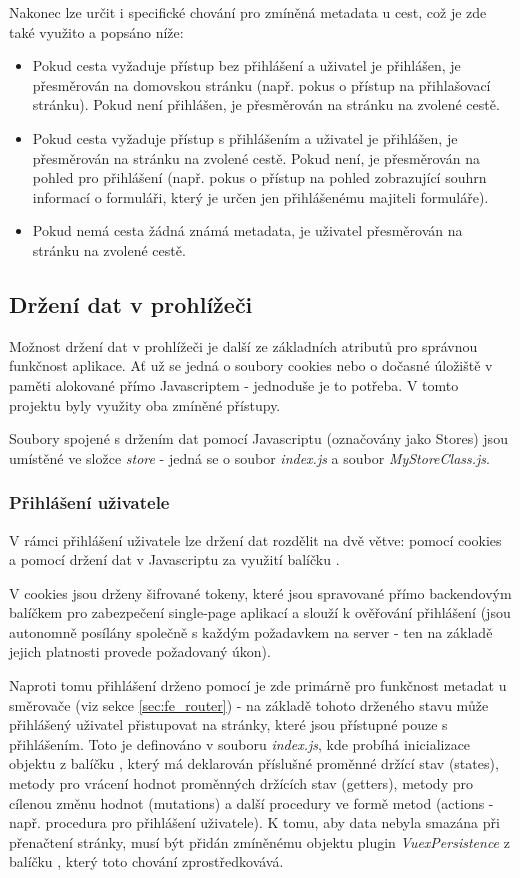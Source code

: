 	Nakonec lze určit i specifické chování pro zmíněná metadata u cest, což je zde také využito a popsáno níže:
	\begin{itemize}
		\item Pokud cesta vyžaduje přístup bez přihlášení a uživatel je přihlášen, je přesměrován na domovskou stránku (např. pokus o přístup na přihlašovací stránku). Pokud není přihlášen, je přesměrován na stránku na zvolené cestě.
		\item Pokud cesta vyžaduje přístup s přihlášením a uživatel je přihlášen, je přesměrován na stránku na zvolené cestě. Pokud není, je přesměrován na pohled pro přihlášení (např. pokus o přístup na pohled zobrazující souhrn informací o formuláři, který je určen jen přihlášenému majiteli formuláře).
		\item Pokud nemá cesta žádná známá metadata, je uživatel přesměrován na stránku na zvolené cestě.
	\end{itemize}

	\subsection{Držení dat v prohlížeči} %
	Možnost držení dat v prohlížeči je další ze základních atributů pro správnou funkčnost aplikace. Ať už se jedná o soubory cookies nebo o dočasné úložiště v paměti alokované přímo Javascriptem - jednoduše je to potřeba. V tomto projektu byly využity oba zmíněné přístupy.
	
	Soubory spojené s držením dat pomocí Javascriptu (označovány jako Stores) jsou umístěné ve složce \textit{store} - jedná se o soubor \textit{index.js} a soubor \textit{MyStoreClass.js}.
	
		\subsubsection{Přihlášení uživatele}
		V rámci přihlášení uživatele lze držení dat rozdělit na dvě větve: pomocí cookies a pomocí držení dat v Javascriptu za využití balíčku . 
		
		V cookies jsou drženy šifrované tokeny, které jsou spravované přímo backendovým balíčkem pro zabezpečení single-page aplikací  a slouží k ověřování přihlášení (jsou autonomně posílány společně s každým požadavkem na server - ten na základě jejich platnosti provede požadovaný úkon). 
		
		Naproti tomu přihlášení drženo pomocí  je zde primárně pro funkčnost metadat u směrovače (viz sekce \ref{sec:fe_router}) - na základě tohoto drženého stavu může přihlášený uživatel přistupovat na stránky, které jsou přístupné pouze s přihlášením. Toto je definováno v souboru \textit{index.js}, kde probíhá inicializace objektu z balíčku , který má deklarován příslušné proměnné držící stav (states), metody pro vrácení hodnot proměnných držících stav (getters), metody pro cílenou změnu hodnot (mutations) a další procedury ve formě metod (actions - např. procedura pro přihlášení uživatele). K tomu, aby data nebyla smazána při přenačtení stránky, musí být přidán zmíněnému objektu plugin \textit{VuexPersistence} z balíčku , který toto chování zprostředkovává.
		

